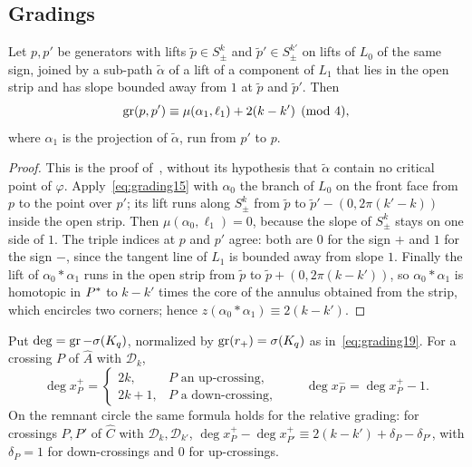 \subsection{Gradings}\label{ss:grad-P}

\begin{lemma}\label{lem:zstepgen}
Let $p,p'$ be generators with lifts $\tilde p\in S^k_\pm$ and $\tilde p'\in S^{k'}_\pm$ on lifts of $L_0$ of the same sign, joined
by a sub-path $\tilde\alpha$ of a lift of a component of $L_1$ that lies in the open strip and has slope bounded away from $1$
at $\tilde p$ and $\tilde p'$. Then
\[
\operatorname{gr}(p,p')\equiv\mu(\alpha_1,\ell_1)+2(k-k')\pmod4,
\]
where $\alpha_1$ is the projection of $\tilde\alpha$, run from $p'$ to $p$.
\end{lemma}

\begin{proof}
This is the proof of~\cite[Lemma~6.8]{WuebbenV}, without its hypothesis that $\tilde\alpha$ contain no critical point of $\varphi$.
Apply~\eqref{eq:grading15} with $\alpha_0$ the branch of $L_0$ on the front face from $p$ to the point over $p'$; its lift runs
along $S^k_\pm$ from $\tilde p$ to $\tilde p'-(0,2\pi(k'-k))$ inside the open strip. Then $\mu(\alpha_0,\ell_1)=0$, because the slope of
$S^k_\pm$ stays on one side of $1$. The triple indices at $p$ and $p'$ agree: both are $0$ for the sign $+$ and $1$ for the sign $-$, since
the tangent line of $L_1$ is bounded away from slope $1$. Finally the lift of $\alpha_0*\alpha_1$ runs in the open strip from $\tilde p$
to $\tilde p+(0,2\pi(k-k'))$, so $\alpha_0*\alpha_1$ is homotopic in $P^{*}$ to $k-k'$ times the core of the annulus obtained from the
strip, which encircles two corners; hence $z(\alpha_0*\alpha_1)\equiv2(k-k')$.
\end{proof}

\begin{proposition}\label{prop:degrees}
Put $\deg=\operatorname{gr}-\sigma(K_q)$, normalized by $\operatorname{gr}(r_+)=\sigma(K_q)$ as in~\eqref{eq:grading19}. For a crossing $P$ of $\hat A$ with $\mathcal D_k$,
\[
\deg x_P^+=\begin{cases}2k,&P\text{ an up-crossing},\\ 2k+1,&P\text{ a down-crossing},\end{cases}\qquad \deg x_P^-=\deg x_P^+-1 .
\]
On the remnant circle the same formula holds for the relative grading: for crossings $P,P'$ of $\hat C$ with $\mathcal D_k,\mathcal D_{k'}$,
$\deg x_P^+-\deg x_{P'}^+\equiv2(k-k')+\delta_P-\delta_{P'}$, with $\delta_P=1$ for down-crossings and $0$ for up-crossings.
\end{proposition}

